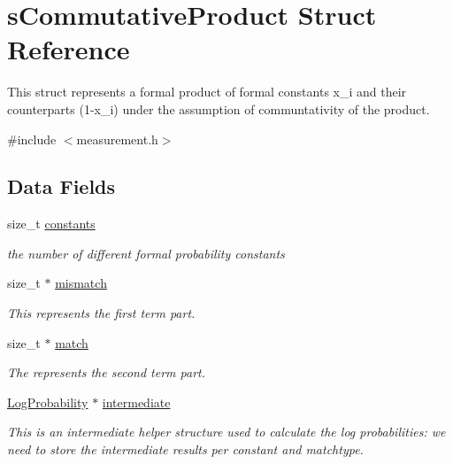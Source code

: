 \hypertarget{structsCommutativeProduct}{\section{s\-Commutative\-Product \-Struct \-Reference}
\label{structsCommutativeProduct}
}


\-This struct represents a formal product of formal constants x\-\_\-i and their counterparts (1-\/x\-\_\-i) under the assumption of communtativity of the product.  




{\ttfamily \#include $<$measurement.\-h$>$}

\subsection*{\-Data \-Fields}
\begin{DoxyCompactItemize}
\item 
size\-\_\-t \hyperlink{structsCommutativeProduct_af77351b19630473b2fedc9267665032a}{constants}
\begin{DoxyCompactList}\small\item\em the number of different formal probability constants \end{DoxyCompactList}\item 
size\-\_\-t $\ast$ \hyperlink{structsCommutativeProduct_a95aa7c0ea80854b88afc16d913137f35}{mismatch}
\begin{DoxyCompactList}\small\item\em \-This represents the first term part. \end{DoxyCompactList}\item 
size\-\_\-t $\ast$ \hyperlink{structsCommutativeProduct_ae78261dbaf0a6455774a84836fe7334d}{match}
\begin{DoxyCompactList}\small\item\em \-The represents the second term part. \end{DoxyCompactList}\item 
\hyperlink{common_2measurement_8h_a0a02860cc83aa9ce63d00855bc9058e0}{\-Log\-Probability} $\ast$ \hyperlink{structsCommutativeProduct_a62301df4ed7d412fb3e45fc7f8d6b0f3}{intermediate}
\begin{DoxyCompactList}\small\item\em \-This is an intermediate helper structure used to calculate the log probabilities\-: we need to store the intermediate results per constant and matchtype. \end{DoxyCompactList}\end{DoxyCompactItemize}


